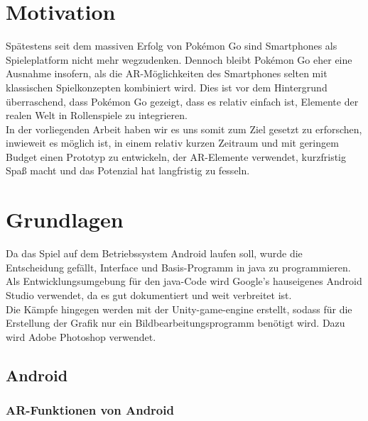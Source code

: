 \documentclass[extern,palatino]{cgBA}
\begin{document}
\section{Motivation}
Spätestens seit dem massiven Erfolg von Pokémon Go sind Smartphones als Spieleplatform nicht mehr wegzudenken. Dennoch bleibt Pokémon Go eher eine Ausnahme insofern, als die AR-Möglichkeiten des Smartphones selten mit klassischen Spielkonzepten kombiniert wird. Dies ist vor dem Hintergrund überraschend, dass Pokémon Go gezeigt, dass es relativ einfach ist, Elemente der realen Welt in Rollenspiele zu integrieren. \\In der vorliegenden Arbeit haben wir es uns somit zum Ziel gesetzt zu erforschen, inwieweit es möglich ist, in einem relativ kurzen Zeitraum und mit geringem Budget einen Prototyp zu entwickeln, der AR-Elemente verwendet, kurzfristig Spaß macht und das Potenzial hat langfristig zu fesseln.
\newpage
\section{Grundlagen}
Da das Spiel auf dem Betriebssystem Android laufen soll, wurde die Entscheidung gefällt, Interface und Basis-Programm in java zu programmieren. Als Entwicklungsumgebung für den java-Code wird Google's hauseigenes Android Studio verwendet, da es gut dokumentiert und weit verbreitet ist.
\\Die Kämpfe hingegen werden mit der Unity-game-engine erstellt, sodass für die Erstellung der Grafik nur ein Bildbearbeitungsprogramm benötigt wird. Dazu wird Adobe Photoshop verwendet.
\subsection{Android}
\subsubsection{AR-Funktionen von Android}
\newpage
\end{document}
